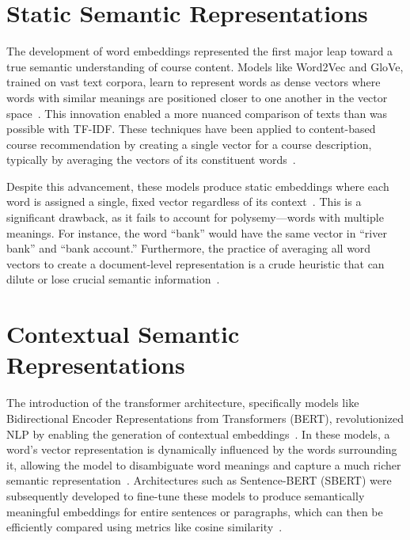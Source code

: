 \section{Static Semantic Representations}\label{ch:2.2}
The development of word embeddings represented the first major leap toward a true semantic understanding of course content.  Models like Word2Vec and GloVe, trained on vast text corpora, learn to represent words as dense vectors where words with similar meanings are positioned closer to one another in the vector space~\cite{mikolov2013,pennington2014glove}.  This innovation enabled a more nuanced comparison of texts than was possible with TF-IDF.  These techniques have been applied to content-based course recommendation by creating a single vector for a course description, typically by averaging the vectors of its constituent words~\cite{pardos10.1145/3330430.3333622}.

Despite this advancement, these models produce static embeddings where each word is assigned a single, fixed vector regardless of its context~\cite{devlin2019bertpretrainingdeepbidirectional}.  This is a significant drawback, as it fails to account for polysemy---words with multiple meanings.  For instance, the word ``bank'' would have the same vector in ``river bank'' and ``bank account.'' Furthermore, the practice of averaging all word vectors to create a document-level representation is a crude heuristic that can dilute or lose crucial semantic information~\cite{reimers-2019-sentence-bert}.

\section{Contextual Semantic Representations}\label{ch:2.3}
The introduction of the transformer architecture, specifically models like Bidirectional Encoder Representations from Transformers (BERT), revolutionized NLP by enabling the generation of contextual embeddings~\cite{devlin2019bertpretrainingdeepbidirectional}.  In these models, a word's vector representation is dynamically influenced by the words surrounding it, allowing the model to disambiguate word meanings and capture a much richer semantic representation~\cite{devlin2019bertpretrainingdeepbidirectional}.  Architectures such as Sentence-BERT (SBERT) were subsequently developed to fine-tune these models to produce semantically meaningful embeddings for entire sentences or paragraphs, which can then be efficiently compared using metrics like cosine similarity~\cite{reimers-2019-sentence-bert}.

